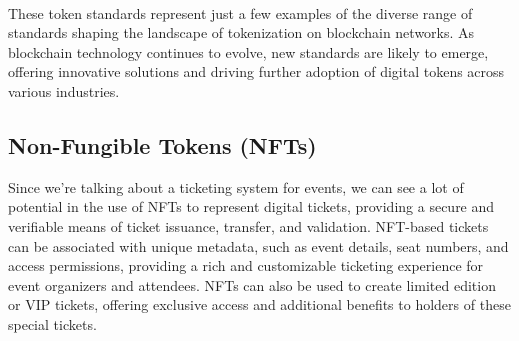 ~

These token standards represent just a few examples of the diverse range of standards shaping the landscape of tokenization on blockchain networks. As blockchain technology continues to evolve, new standards are likely to emerge, offering innovative solutions and driving further adoption of digital tokens across various industries.

\subsection{Non-Fungible Tokens (NFTs)}
\label{subsec:nfts}

Since we're talking about a ticketing system for events, we can see a lot of potential in the use of NFTs to represent digital tickets, providing a secure and verifiable means of ticket issuance, transfer, and validation. NFT-based tickets can be associated with unique metadata, such as event details, seat numbers, and access permissions, providing a rich and customizable ticketing experience for event organizers and attendees. NFTs can also be used to create limited edition or VIP tickets, offering exclusive access and additional benefits to holders of these special tickets.
